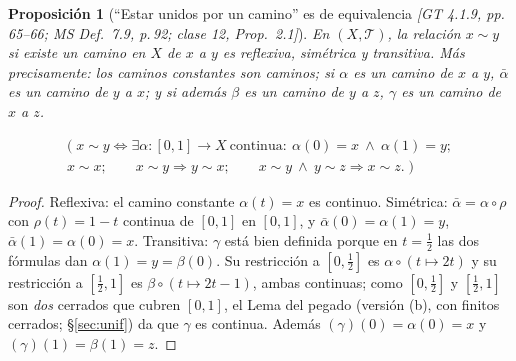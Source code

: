 \documentclass[11pt,a4paper]{article}
\newcommand{\lgc}[1]{\par\vspace{-3pt}\begin{gather*}\big(\;#1\;\big)\end{gather*}\vspace{-6pt}}
\newcommand{\figtit}[1]{\par\vspace{2pt}{\footnotesize\itshape #1}\par}
\theoremstyle{definition}
\theoremstyle{plain}
\newtheorem{proposicion}[definicion]{Proposición}
\newcommand{\fnt}[1]{{\normalfont\small\itshape\color{gray!150!black}[#1]}}
\newcommand{\tp}{\mathcal{T}}
\begin{document}
\begin{proposicion}[``Estar unidos por un camino'' es de equivalencia \fnt{GT 4.1.9, pp.\,65--66; MS Def.\ 7.9, p.\,92; clase 12, Prop.\ 2.1}]\label{cc:equiv}
En $(X,\tp)$, la relación $x\sim y$ si existe un camino en $X$ de $x$ a $y$ es reflexiva, simétrica y transitiva. Más precisamente: los caminos constantes son caminos; si $\alpha$ es un camino de $x$ a $y$, $\bar\alpha$ es un camino de $y$ a $x$; y si además $\beta$ es un camino de $y$ a $z$, $\gamma$ es un camino de $x$ a $z$.
\lgc{x\sim y\iff \exists\alpha:[0,1]\to X\ \text{continua}:\ \alpha(0)=x\ \wedge\ \alpha(1)=y;\\
x\sim x;\qquad x\sim y\Rightarrow y\sim x;\qquad x\sim y\ \wedge\ y\sim z\Rightarrow x\sim z.}
\end{proposicion}

\begin{proof}
Reflexiva: el camino constante $\alpha(t)=x$ es continuo. Simétrica: $\bar\alpha=\alpha\circ\rho$ con $\rho(t)=1-t$ continua de $[0,1]$ en $[0,1]$, y $\bar\alpha(0)=\alpha(1)=y$, $\bar\alpha(1)=\alpha(0)=x$.
Transitiva: $\gamma$ está bien definida porque en $t=\frac12$ las dos fórmulas dan $\alpha(1)=y=\beta(0)$. Su restricción a $[0,\frac12]$ es $\alpha\circ(t\mapsto2t)$ y su restricción a $[\frac12,1]$ es $\beta\circ(t\mapsto2t-1)$, ambas continuas; como $[0,\frac12]$ y $[\frac12,1]$ son \emph{dos} cerrados que cubren $[0,1]$, el Lema del pegado (versión (b), con finitos cerrados; \S\ref{sec:unif}) da que $\gamma$ es continua. Además $(\gamma)(0)=\alpha(0)=x$ y $(\gamma)(1)=\beta(1)=z$.
\end{proof}

\begin{figure}[ht]
\centering
{}
\figtit{Figura 21. Yuxtaposición: en la primera mitad del tiempo se recorre $\alpha$ (azul) a doble velocidad, en la segunda $\beta$ (rojo). Pega bien porque las dos fórmulas coinciden en $t=\frac12$; la continuidad sale del lema del pegado con dos cerrados.}
\end{figure}
\end{document}
